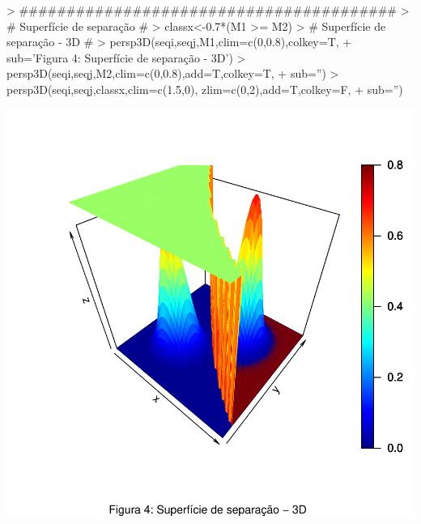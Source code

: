 \documentclass{article}
\begin{document}
\begin{Schunk}
\begin{Sinput}
> ########################################
> # Superfície de separação #
> classx<-0.7*(M1 >= M2)
> # Superfície de separação - 3D #
> persp3D(seqi,seqj,M1,clim=c(0,0.8),colkey=T,
+         sub='Figura 4: Superfície de separação - 3D')
> persp3D(seqi,seqj,M2,clim=c(0,0.8),add=T,colkey=T,
+         sub='')
> persp3D(seqi,seqj,classx,clim=c(1.5,0), zlim=c(0,2),add=T,colkey=F,
+         sub='')
\end{Sinput}
\end{Schunk}
\includegraphics{gaussr2-005}
\end{document}
